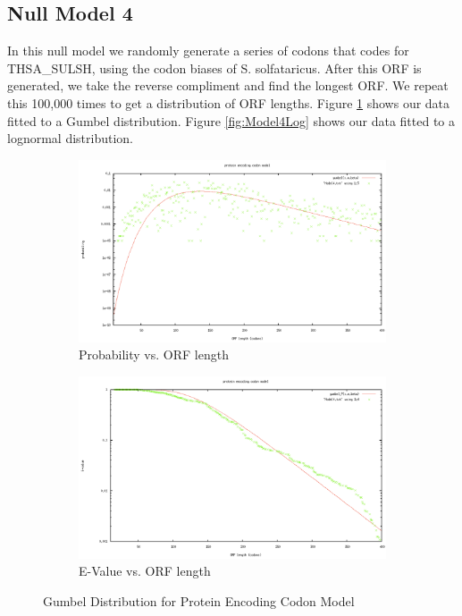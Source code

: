 \documentclass[11pt]{article}
\begin{document}
\subsection{Null Model 4}
In this null model we randomly generate a series of codons that codes for THSA\_SULSH, using the codon biases of S. solfataricus.  After this ORF is generated, we take the reverse compliment and find the longest ORF.  We repeat this 100,000 times to get a distribution of ORF lengths.  Figure \ref{fig:Mode4Gum} shows our data fitted to a Gumbel distribution.  Figure \ref{fig:Model4Log} shows our data fitted to a lognormal distribution.

\begin{figure}[!htb]
        \centering
        \begin{subfigure}[b]{0.49\textwidth}
                \centering
		\includegraphics[width=\textwidth]{Model4GumProb.pdf} 
		\caption{Probability vs. ORF length}
        \end{subfigure}
        \begin{subfigure}[b]{0.49\textwidth}
                \centering
		\includegraphics[width=\textwidth]{Model4GumE.pdf} 
		\caption{E-Value vs. ORF length}
        \end{subfigure}

        \caption{Gumbel Distribution for Protein Encoding Codon Model}\label{fig:Mode4Gum} 
\end{figure}
\end{document}
